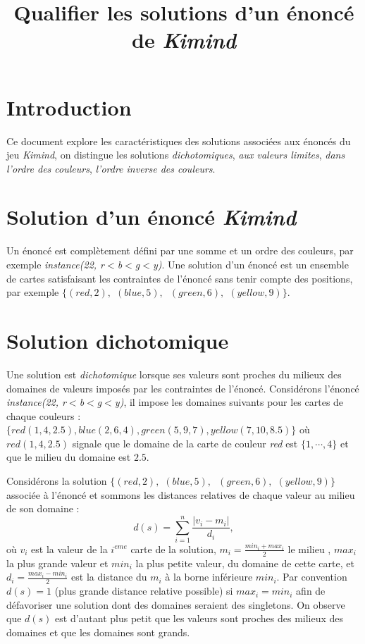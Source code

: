 \documentclass[a4paper, 12]{article}
\newcommand\set[1]{\ensuremath{\{#1\}}}
\begin{document}
\title{Qualifier les solutions d’un énoncé de \emph{Kimind}}
\date{}
\maketitle

\section{Introduction}
Ce document explore les caractéristiques des solutions associées aux énoncés du jeu \emph{Kimind}, on distingue les solutions \emph{dichotomiques}, \emph{aux valeurs limites}, \emph{dans l’ordre des couleurs}, \emph{l’ordre inverse des couleurs}.

\section{Solution d’un énoncé \emph{Kimind}}
Un énoncé est complètement défini par une somme et un ordre des couleurs, par exemple  \emph{instance(22, r$<$b$<$g$<$y)}. Une solution d'un énoncé est un ensemble de cartes satisfaisant les contraintes de l'énoncé sans tenir compte des positions, par exemple  \emph{$\{(red,2),$ $(blue,5),\ $ $ (green,6),$ $(yellow,9)\}$}. 

\section{Solution dichotomique}
Une solution est \emph{dichotomique} lorsque ses valeurs sont proches du milieux des domaines de valeurs imposés par les contraintes de l’énoncé. Considérons l’énoncé \emph{instance(22, r$<$b$<$g$<$y)}, il impose les domaines suivants pour les cartes de chaque couleurs : 
\set{red(1, 4, 2.5), blue(2, 6, 4), green(5, 9, 7), yellow(7, 10, 8.5)} où $red(1, 4, 2.5)$ signale que le domaine de la carte de couleur \emph{red} est \set{1,\cdots,4} et que le milieu du domaine est $2.5$.

Considérons la solution   \emph{$\{(red,2),$ $(blue,5),\ $ $ (green,6),$ $(yellow,9)\}$} associée à l’énoncé et sommons les distances relatives de chaque valeur au milieu de son domaine : 
$$ d(s) = \sum_{i=1}^{n} \frac{|v_i - m_i|}{d_i},$$ 
où $v_i$ est la valeur de la $i^{eme}$ carte de la solution, $m_i = \frac{min_i + max_i}{2}$ le milieu , $max_i$ la plus grande valeur et $min_i$ la plus petite valeur, du domaine de cette carte,  et $d_i = \frac{max_i - min_i}{2}$ est la distance du $m_i$ à la borne inférieure $min_i$. Par convention $d(s) = 1$ (plus grande distance relative possible) si 
$max_i = min_i$ afin de défavoriser une solution dont des domaines seraient des singletons.
On observe que $d(s)$ est d’autant plus petit que les valeurs sont proches des milieux des domaines et que les domaines sont grands.
\end{document}
